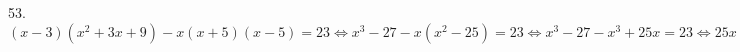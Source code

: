 53. $(x-3)(x^2+3x+9)-x(x+5)(x-5)=23\Leftrightarrow x^3-27-x(x^2-25)=23\Leftrightarrow
x^3-27-x^3+25x=23\Leftrightarrow25x=50\Leftrightarrow x=2.$\\
